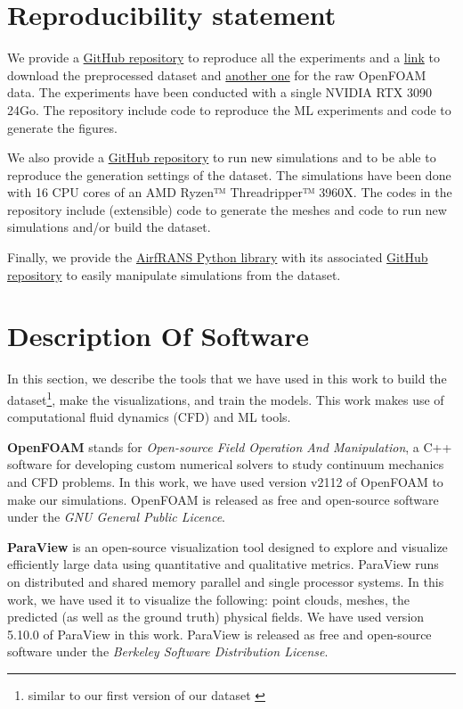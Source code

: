 \begin{subappendices}	
	\section{Reproducibility statement}
	
	We provide a  \href{https://github.com/Extrality/AirfRANS}{GitHub repository} to reproduce all the experiments and a \href{https://data.isir.upmc.fr/extrality/NeurIPS_2022/Dataset.zip}{link} to download the preprocessed dataset and \href{https://data.isir.upmc.fr/extrality/NeurIPS_2022/OF_dataset.zip}{another one} for the raw OpenFOAM data. The experiments have been conducted with a single NVIDIA RTX 3090 24Go. The repository include code to reproduce the ML experiments and code to generate the figures.
	
	We also provide a \href{https://github.com/Extrality/NACA_simulation}{GitHub repository} to run new simulations and to be able to reproduce the generation settings of the dataset. The simulations have been done with 16 CPU cores of an AMD Ryzen™ Threadripper™ 3960X. The codes in the repository include (extensible) code to generate the meshes and code to run new simulations and/or build the dataset.
	
	Finally, we provide the \href{https://airfrans.readthedocs.io/en/latest/index.html}{AirfRANS Python library} with its associated \href{https://github.com/Extrality/airfrans_lib}{GitHub repository} to easily manipulate simulations from the dataset.
	
	\section{Description Of Software}
	In this section, we describe the tools that we have used in this work to build the dataset\footnote{similar to our first version of our dataset \cite{bonnet2022an}}, make the visualizations, and train the models. This work makes use of computational fluid dynamics (CFD) and ML tools.
	
	\textbf{OpenFOAM} \cite{OpenFOAM} stands for \emph{Open-source Field Operation And Manipulation}, a C++ software for developing custom numerical solvers to study continuum mechanics and CFD problems. In this work, we have used version v2112 of OpenFOAM to make our simulations. OpenFOAM is released as free and open-source software under the \emph{GNU General Public Licence}.
	
	\textbf{ParaView} \cite{paraview} is an open-source visualization tool designed to explore and visualize efficiently large data using quantitative and qualitative metrics. ParaView runs on distributed and shared memory parallel and single processor systems. In this work, we have used it to visualize the following: point clouds, meshes, the predicted (as well as the ground truth) physical fields. We have used version 5.10.0 of ParaView in this work. ParaView  is released  as free and open-source software under the \emph{Berkeley Software Distribution License}.
	

\end{subappendices}
